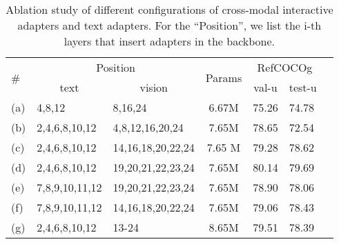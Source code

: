 \begin{table}[t]
\centering
\renewcommand{\arraystretch}{1.5}
\caption{Ablation study of different configurations of cross-modal interactive adapters and text adapters. For the ``Position'', we list the i-th layers that insert adapters in the backbone.
}
\label{tab:layer}
\small
\setlength{\tabcolsep}{3pt}
\begin{tabular}{l|l|l|c|lll}

\toprule
\multirow{2}{*}{\#} & \multicolumn{2}{c|}{Position} & \multirow{2}{*}{Params}  & \multicolumn{2}{c}{RefCOCOg} \\ \cline{7-7} 
 &  \multicolumn{1}{c|}{text}  &  \multicolumn{1}{c|}{vision} & & \multicolumn{1}{c|}{val-u} & \multicolumn{1}{c}{test-u}  \\ \midrule
(a) &4,8,12 & 8,16,24 & 6.67M   & \multicolumn{1}{l|}{75.26} & 74.78 \\

(b) &2,4,6,8,10,12 & 4,8,12,16,20,24 & 7.65M   & \multicolumn{1}{l|}{78.65} & 72.54 \\ 
 
(c) &2,4,6,8,10,12 & 14,16,18,20,22,24 &7.65 M  & \multicolumn{1}{l|}{79.28} & 78.62 \\

\rowcolor{gray!20}
(d) & 2,4,6,8,10,12& 19,20,21,22,23,24 & 7.65M  & \multicolumn{1}{l|}{80.14} & 79.69 \\

(e) &7,8,9,10,11,12& 19,20,21,22,23,24 & 7.65M   & \multicolumn{1}{l|}{78.90} & 78.06 \\

(f)  & 7,8,9,10,11,12& 14,16,18,20,22,24 & 7.65M  & \multicolumn{1}{l|}{79.06} & 78.43 \\

(g) & 2,4,6,8,10,12& 13-24 & 8.65M  & \multicolumn{1}{l|}{79.51} & 78.39 \\


\bottomrule
\end{tabular}

\end{table}
